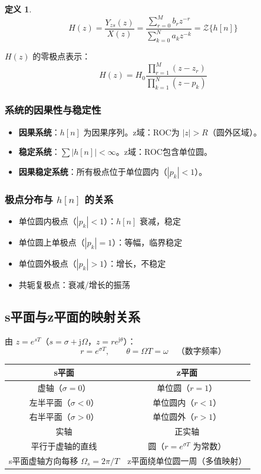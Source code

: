 \documentclass[11pt,a4paper]{ctexart}
\newtheorem{definition}{定义}[section]
\newcommand{\ZT}{\mathcal{Z}}           %
\newcommand{\jj}{\mathrm{j}}            %
\begin{document}
\begin{definition}
\[
H(z) = \frac{Y_{zs}(z)}{X(z)} = \frac{\sum_{r=0}^{M} b_r z^{-r}}{\sum_{k=0}^{N} a_k z^{-k}} = \ZT\{h[n]\}
\]
\end{definition}

$H(z)$ 的零极点表示：
\[
H(z) = H_0\frac{\prod_{r=1}^{M}(z - z_r)}{\prod_{k=1}^{N}(z - p_k)}
\]

\subsubsection{系统的因果性与稳定性}
\begin{itemize}
    \item \textbf{因果系统}：$h[n]$ 为因果序列。z域：ROC为 $|z| > R$（圆外区域）。
    \item \textbf{稳定系统}：$\sum |h[n]| < \infty$。z域：ROC包含单位圆。
    \item \textbf{因果稳定系统}：所有极点位于单位圆内（$|p_k| < 1$）。
\end{itemize}

\subsubsection{极点分布与 $h[n]$ 的关系}
\begin{itemize}
    \item 单位圆内极点（$|p_k| < 1$）：$h[n]$ 衰减，稳定
    \item 单位圆上单极点（$|p_k| = 1$）：等幅，临界稳定
    \item 单位圆外极点（$|p_k| > 1$）：增长，不稳定
    \item 共轭复极点：衰减/增长的振荡
\end{itemize}

\subsection{s平面与z平面的映射关系}

由 $z = e^{sT}$（$s = \sigma + \jj\Omega$，$z = r e^{\jj\theta}$）：
\[
r = e^{\sigma T},\qquad \theta = \Omega T = \omega \quad\text{（数字频率）}
\]

\begin{tabular}{c|c}
\toprule
s平面 & z平面 \\
\midrule
虚轴（$\sigma = 0$）& 单位圆（$r = 1$）\\
左半平面（$\sigma < 0$）& 单位圆内（$r < 1$）\\
右半平面（$\sigma > 0$）& 单位圆外（$r > 1$）\\
实轴 & 正实轴 \\
平行于虚轴的直线 & 圆（$r = e^{\sigma T}$ 为常数）\\
s平面虚轴方向每移 $\Omega_s = 2\pi/T$ & z平面绕单位圆一周（多值映射）\\
\bottomrule
\end{tabular}
\end{document}
